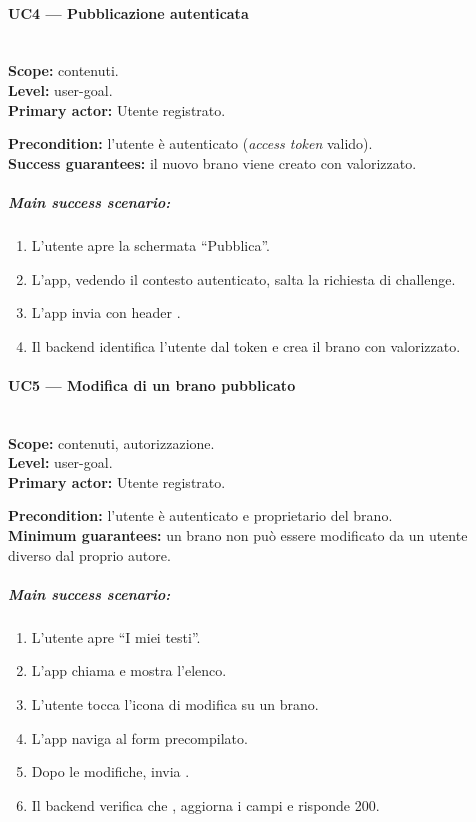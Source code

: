 \paragraph{UC4 --- Pubblicazione autenticata}\hfill\\
\textbf{Scope:} contenuti.\\
\textbf{Level:} user-goal.\\
\textbf{Primary actor:} Utente registrato.

\textbf{Precondition:} l'utente è autenticato (\emph{access token} valido).\\
\textbf{Success guarantees:} il nuovo brano viene creato con
 valorizzato.

\subparagraph{Main success scenario:}
\begin{enumerate}
    \item L'utente apre la schermata ``Pubblica''.
    \item L'app, vedendo il contesto autenticato, salta la richiesta di
    challenge.
    \item L'app invia  con header
    .
    \item Il backend identifica l'utente dal token e crea il brano con
     valorizzato.
\end{enumerate}

\paragraph{UC5 --- Modifica di un brano pubblicato}\hfill\\
\textbf{Scope:} contenuti, autorizzazione.\\
\textbf{Level:} user-goal.\\
\textbf{Primary actor:} Utente registrato.

\textbf{Precondition:} l'utente è autenticato e proprietario del brano.\\
\textbf{Minimum guarantees:} un brano non può essere modificato da un
utente diverso dal proprio autore.

\subparagraph{Main success scenario:}
\begin{enumerate}
    \item L'utente apre ``I miei testi''.
    \item L'app chiama  e mostra l'elenco.
    \item L'utente tocca l'icona di modifica su un brano.
    \item L'app naviga al form precompilato.
    \item Dopo le modifiche, invia .
    \item Il backend verifica che ,
    aggiorna i campi e risponde 200.
\end{enumerate}

